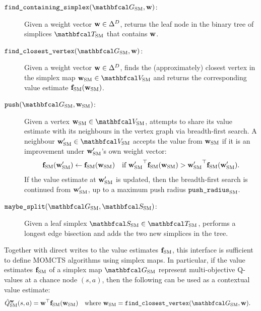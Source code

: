    \begin{description}
        \item[$\fcs(\GSM, \bff{w})$:] 
            Given a weight vector $\mathbf{w}\in\Delta^D$, returns the leaf node in the binary tree of simplices $\TSM$ that contains $\mathbf{w}$.
        \item[$\fcv(\GSM, \bff{w})$:] 
            Given a weight vector $\mathbf{w}\in\Delta^D$, finds the (approximately) closest vertex in the simplex map $\wSM\in\VSM$ and returns the corresponding value estimate ${\mathbf{f}_{{\textnormal{SM}}}}({\mathbf{w}_{{\textnormal{SM}}}})$.
        \item[$\push(\GSM,\wSM)$:] 
            Given a vertex $\wSM\in\VSM$, attempts to share its value estimate with its neighbours in the vertex graph via breadth-first search. A neighbour $\wSMprime\in\VSM$ accepts the value from ${\mathbf{w}_{{\textnormal{SM}}}}$ if it is an improvement under ${\mathbf{w}'_{{\textnormal{SM}}}}$'s own weight vector:
            \begin{align}
                {\mathbf{f}_{{\textnormal{SM}}}}({\mathbf{w}'_{{\textnormal{SM}}}}) \leftarrow {\mathbf{f}_{{\textnormal{SM}}}}({\mathbf{w}_{{\textnormal{SM}}}}) \quad 
                \text{if } {\mathbf{w}'_{{\textnormal{SM}}}}^\top {\mathbf{f}_{{\textnormal{SM}}}}({\mathbf{w}_{{\textnormal{SM}}}}) > 
                {\mathbf{w}'_{{\textnormal{SM}}}}^\top {\mathbf{f}_{{\textnormal{SM}}}}({\mathbf{w}'_{{\textnormal{SM}}}}).
                \label{eq:6:sm_message_passing}
            \end{align}
            If the value estimate at ${\mathbf{w}'_{{\textnormal{SM}}}}$ is updated, then the breadth-first search is continued from ${\mathbf{w}'_{{\textnormal{SM}}}}$, up to a maximum push radius ${\textnormal{\texttt{push\_radius}}_{{\textnormal{SM}}}}$.
        \item[$\splitsimplex(\GSM,\SSM)$:]
            Given a leaf simplex $\SSM\in\TSM$, performs a longest edge bisection and adds the two new simplices in the tree.
    \end{description}

    Together with direct writes to the value estimates ${\mathbf{f}_{{\textnormal{SM}}}}$, this interface is sufficient to define MOMCTS algorithms using simplex maps. In particular, if the value estimates ${\mathbf{f}_{{\textnormal{SM}}}}$ of a simplex map $\GSM$ represent multi-objective Q-values at a chance node $(s,a)$, then the following can be used as a contextual value estimate:
    \begin{align}
        \Qsmctx{\bff{w}}(s,a) 
            &= \bff{w}^\top \fSM(\wSM) \quad \text{where } \wSM = \fcv(\GSM, \bff{w}).
        \label{eq:6:sm_contextual_qvalue}
    \end{align}


